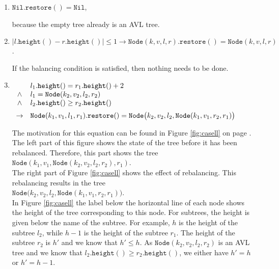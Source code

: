 \begin{enumerate}
\item $\mathtt{Nil}.\mathtt{restore}() = \mathtt{Nil}$,

      because the empty tree already is an  AVL tree.
\item $|l.\mathtt{height}() - r.\mathtt{height}()| \leq 1 \rightarrow 
       \mathtt{Node}(k,v,l,r).\mathtt{restore}() = \mathtt{Node}(k,v,l,r)$.

      If the balancing condition is satisfied, then nothing needs to be done. 
\item $\begin{array}[t]{cl}
              & l_1.\mathtt{height}() = r_1.\mathtt{height}() + 2    \\ 
       \wedge & l_1 = \mathtt{Node}(k_2,v_2,l_2,r_2)                 \\
       \wedge & l_2.\mathtt{height}() \geq r_2.\mathtt{height}()     \\[0.2cm]
       \rightarrow & \mathtt{Node}(k_1,v_1,l_1,r_1).\mathtt{restore}() = 
                     \mathtt{Node}\bigl(k_2,v_2,l_2,\mathtt{Node}(k_1,v_1,r_2,r_1)\bigr)
       \end{array}
      $

      The motivation for this equation can be found in Figure \ref{fig:casell}
      on page \pageref{fig:casell}.  The left part of this figure shows the state
      of the tree before it has been rebalanced.  Therefore, this part shows the tree
      \\[0.2cm]
      \hspace*{1.3cm}
      $\mathtt{Node}(k_1,v_1, \mathtt{Node}(k_2,v_2,l_2,r_2), r_1)$. 
      \\[0.2cm]
      The right part of Figure \ref{fig:casell} shows the effect of rebalancing.  
      This rebalancing results in the tree
      \\[0.2cm]
      \hspace*{1.3cm}
      $\mathtt{Node}\bigl(k_2,v_2,l_2,\mathtt{Node}(k_1,v_1,r_2,r_1)\bigr)$.
      \\[0.2cm]
      In Figure \ref{fig:casell} the label below the horizontal line of each node shows the height
      of the tree corresponding to this node.  For subtrees, the height is given below the name of
      the subtree.  For example,  $h$ is the height of the subtree 
      $l_2$, while $h-1$ is the height of the subtree $r_1$. The height of the subtree $r_2$
      is $h'$ and we know that $h' \leq h$.  As $\mathtt{Node}(k_2,v_2,l_2,r_2)$ is an AVL tree and we know that
      $l_2.\mathtt{height}() \geq r_2.\mathtt{height}()$, we
      either have $h' = h$ or $h' = h-1$.


\end{enumerate}
